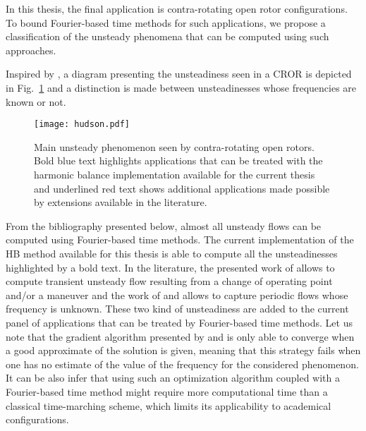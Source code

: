 
In this thesis, the final application is contra-rotating open rotor
configurations. To bound Fourier-based time methods for such
applications, we propose a classification of the
unsteady phenomena that can be computed using such approaches.

Inspired by \citet{Hodson1998},
a diagram presenting the unsteadiness seen in 
a CROR is depicted in Fig.~\ref{fig:hudson} and a distinction
is made between unsteadinesses whose frequencies are
known or not.
\begin{figure}
  \centering
  \texttt{[image: hudson.pdf]}
  \caption{Main unsteady phenomenon seen by contra-rotating
  open rotors. Bold blue text highlights applications that can
  be treated with the harmonic balance implementation available for the
  current thesis and underlined red text shows additional applications
  made possible by extensions available in the literature.}
  \label{fig:hudson}
\end{figure}
From the bibliography presented below, almost all
unsteady flows can be computed using Fourier-based time methods.
The current implementation of the HB method available for
this thesis is able to compute all the unsteadinesses highlighted
by a bold text. In the literature, the presented work of 
\citet{Mavriplis2012} allows to compute transient unsteady flow
resulting from a change of operating point and/or a maneuver and
the work of \citet{McMullen2002} and \citet{Gopinath2006} allows
to capture periodic flows whose frequency is unknown. These two
kind of unsteadiness are added
to the current panel of applications that can
be treated by Fourier-based time methods. Let us note
that the gradient algorithm presented by \citet{McMullen2002}
and \citet{Gopinath2006} is only able to converge when a 
good approximate of the solution is given, meaning
that this strategy fails when one has no estimate
of the value of the frequency for the considered phenomenon.
It can be also infer that using such an optimization algorithm
coupled with a Fourier-based time method
might require more computational time than a classical time-marching scheme,
which limits its applicability to academical configurations.

